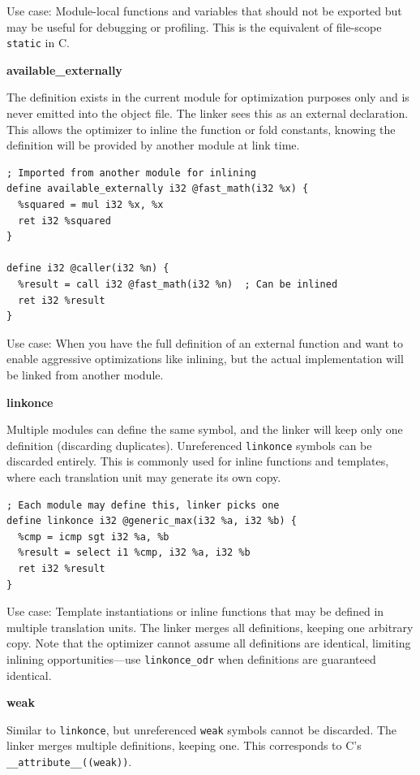 Use case: Module-local functions and variables that should not be exported but may be useful for debugging or profiling. This is the  equivalent of file-scope \texttt{static} in C.

\textbf{available\_externally}

The definition exists in the current module for optimization purposes only and is never emitted into the object file.
The linker sees this as an external declaration.
This allows the optimizer to inline the function or fold constants, knowing the definition will be provided by another module at link time.

\begin{lstlisting}[style=ir]
; Imported from another module for inlining
define available_externally i32 @fast_math(i32 %x) {
  %squared = mul i32 %x, %x
  ret i32 %squared
}

define i32 @caller(i32 %n) {
  %result = call i32 @fast_math(i32 %n)  ; Can be inlined
  ret i32 %result
}
\end{lstlisting}

Use case: When you have the full definition of an external function and want to enable aggressive optimizations like inlining, but the actual implementation will be linked from another module.

\textbf{linkonce}

Multiple modules can define the same symbol, and the linker will keep only one definition (discarding duplicates).
Unreferenced \texttt{linkonce} symbols can be discarded entirely.
This is commonly used for inline functions and templates, where each translation unit may generate its own copy.

\begin{lstlisting}[style=ir]
; Each module may define this, linker picks one
define linkonce i32 @generic_max(i32 %a, i32 %b) {
  %cmp = icmp sgt i32 %a, %b
  %result = select i1 %cmp, i32 %a, i32 %b
  ret i32 %result
}
\end{lstlisting}

Use case: Template instantiations or inline functions that may be defined in multiple translation units.
The linker merges all definitions, keeping one arbitrary copy.
Note that the optimizer cannot assume all definitions are identical, limiting inlining opportunities---use \texttt{linkonce\_odr} when definitions are guaranteed identical.

\textbf{weak}

Similar to \texttt{linkonce}, but unreferenced \texttt{weak} symbols cannot be discarded. The linker merges multiple definitions, keeping one. This corresponds to C's \texttt{\_\_attribute\_\_((weak))}.

